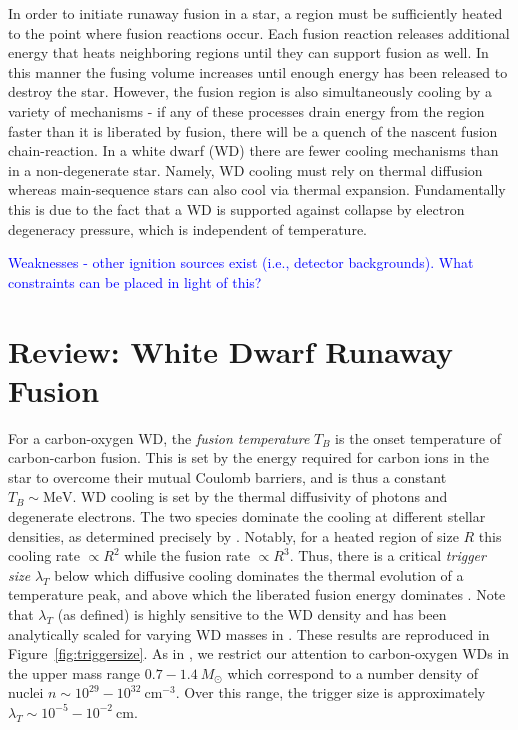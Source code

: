 \documentclass[twocolumn,showpacs,preprintnumbers,amsmath,amssymb,prd]{revtex4}
\newcommand{\MeV}{\text{MeV}}
\newcommand{\cm}{\text{cm}}
\begin{document}
In order to initiate runaway fusion in a star, a region must be sufficiently heated to the point where fusion reactions occur.  Each fusion reaction releases additional energy that heats neighboring regions until they can support fusion as well. In this manner the fusing volume increases until enough energy has been released to destroy the star.  However, the fusion region is also simultaneously cooling by a variety of mechanisms - if any of these processes drain energy from the region faster than it is liberated by fusion, there will be a quench of the nascent fusion chain-reaction. In a white dwarf (WD) there are fewer cooling mechanisms than in a non-degenerate star. Namely, WD cooling must rely on thermal diffusion whereas main-sequence stars can also cool via thermal expansion. Fundamentally this is due to the fact that a WD is supported against collapse by electron degeneracy pressure, which is independent of temperature.


\textcolor{blue}{Weaknesses - other ignition sources exist (i.e., detector backgrounds). What constraints can be placed in light of this?}


\section{Review: White Dwarf Runaway Fusion}

For a carbon-oxygen WD, the \emph{fusion temperature} $T_B$ is the onset temperature of carbon-carbon fusion. This is set by the energy required for carbon ions in the star to overcome their mutual Coulomb barriers, and is thus a constant $T_B \sim \MeV$. WD cooling is set by the thermal diffusivity of photons and degenerate electrons. The two species dominate the cooling at different stellar densities, as determined precisely by \cite{Woosley}. Notably, for a heated region of size $R$ this cooling rate $\propto R^2$ while the fusion rate $\propto R^3$. Thus, there is a critical \emph{trigger size} $\lambda_T$ below which diffusive cooling dominates the thermal evolution of a temperature peak, and above which the liberated fusion energy dominates \cite{Woosley}. Note that $\lambda_T$ (as defined) is highly sensitive to the WD density and has been analytically scaled for varying WD masses in \cite{Graham:2015apa}. These results are reproduced in Figure~\ref{fig:triggersize}. As in \cite{Graham:2015apa}, we restrict our attention to carbon-oxygen WDs in the upper mass range $0.7 - 1.4 ~M_{\odot}$ which correspond to a number density of nuclei $n \sim 10^{29} - 10^{32} ~\cm^{-3}$. Over this range, the trigger size is approximately $\lambda_T \sim 10^{-5} - 10^{-2} ~\text{cm}$.
\end{document}
